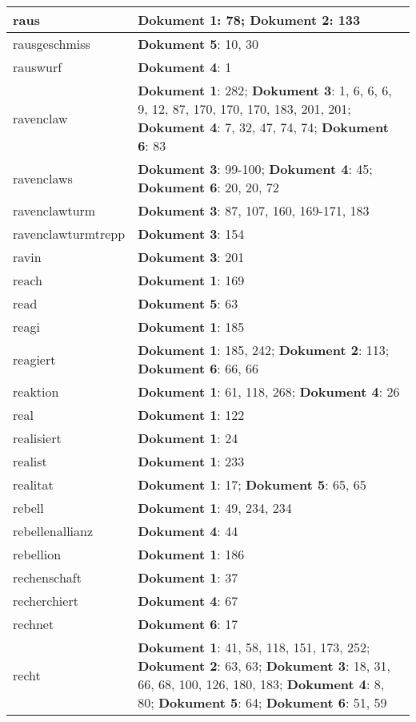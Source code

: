 \documentclass[a5paper]{article}
\begin{document}
\begin{longtable}[l]{|l|p{3in}|}
\hline
raus & \textbf{Dokument 1}: 78; \textbf{Dokument 2}: 133 \\
\hline
rausgeschmiss & \textbf{Dokument 5}: 10, 30 \\
\hline
rauswurf & \textbf{Dokument 4}: 1 \\
\hline
ravenclaw & \textbf{Dokument 1}: 282; \textbf{Dokument 3}: 1, 6, 6, 6, 9, 12, 87, 170, 170, 170, 183, 201, 201; \textbf{Dokument 4}: 7, 32, 47, 74, 74; \textbf{Dokument 6}: 83 \\
\hline
ravenclaws & \textbf{Dokument 3}: 99-100; \textbf{Dokument 4}: 45; \textbf{Dokument 6}: 20, 20, 72 \\
\hline
ravenclawturm & \textbf{Dokument 3}: 87, 107, 160, 169-171, 183 \\
\hline
ravenclawturmtrepp & \textbf{Dokument 3}: 154 \\
\hline
ravin & \textbf{Dokument 3}: 201 \\
\hline
reach & \textbf{Dokument 1}: 169 \\
\hline
read & \textbf{Dokument 5}: 63 \\
\hline
reagi & \textbf{Dokument 1}: 185 \\
\hline
reagiert & \textbf{Dokument 1}: 185, 242; \textbf{Dokument 2}: 113; \textbf{Dokument 6}: 66, 66 \\
\hline
reaktion & \textbf{Dokument 1}: 61, 118, 268; \textbf{Dokument 4}: 26 \\
\hline
real & \textbf{Dokument 1}: 122 \\
\hline
realisiert & \textbf{Dokument 1}: 24 \\
\hline
realist & \textbf{Dokument 1}: 233 \\
\hline
realitat & \textbf{Dokument 1}: 17; \textbf{Dokument 5}: 65, 65 \\
\hline
rebell & \textbf{Dokument 1}: 49, 234, 234 \\
\hline
rebellenallianz & \textbf{Dokument 4}: 44 \\
\hline
rebellion & \textbf{Dokument 1}: 186 \\
\hline
rechenschaft & \textbf{Dokument 1}: 37 \\
\hline
recherchiert & \textbf{Dokument 4}: 67 \\
\hline
rechnet & \textbf{Dokument 6}: 17 \\
\hline
recht & \textbf{Dokument 1}: 41, 58, 118, 151, 173, 252; \textbf{Dokument 2}: 63, 63; \textbf{Dokument 3}: 18, 31, 66, 68, 100, 126, 180, 183; \textbf{Dokument 4}: 8, 80; \textbf{Dokument 5}: 64; \textbf{Dokument 6}: 51, 59 \\

\end{longtable}
\end{document}
